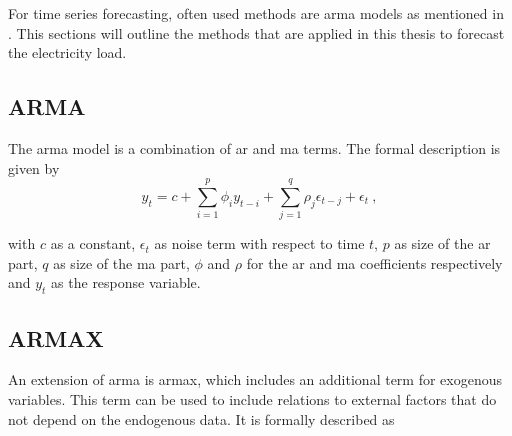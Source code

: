 For time series forecasting, often used methods are \eg \gls{arma} models as mentioned in . This sections will outline the methods that are applied in this thesis to forecast the electricity load.\\%

\subsection{ARMA}

The \gls{arma} model is a combination of \acrfull{ar} and \acrfull{ma} terms. The formal description is given by\\

\begin{equation}
y_t = c+\sum_{i=1}^{p}\phi_iy_{t-i}+\sum_{j=1}^{q}\rho_j\epsilon_{t-j}+\epsilon_t~,
\label{eq:arma}
\end{equation}

with $c$ as a constant, $\epsilon_t$ as noise term with respect to time $t$, $p$ as size of the \gls{ar} part, $q$ as size of the \gls{ma} part, $\phi$ and $\rho$ for the \gls{ar} and \gls{ma} coefficients respectively and $y_t$ as the response variable.\\

\subsection{ARMAX}

An extension of \gls{arma} is \gls{armax}, which includes an additional term for exogenous variables. This term can be used to include relations to external factors that do not depend on the endogenous data. It is formally described as\\

